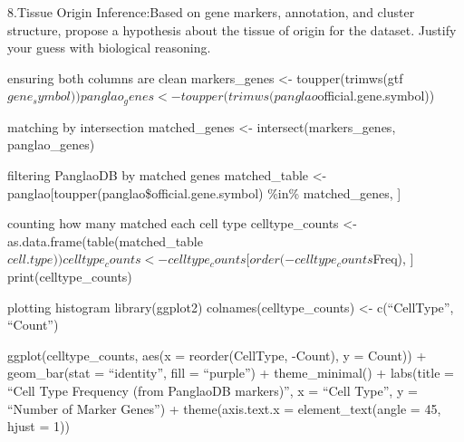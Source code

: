 \documentclass[
  ignorenonframetext,
]{beamer}
\begin{document}
\begin{frame}{8.Tissue Origin Inference:Based on gene markers,
annotation, and cluster structure, propose a hypothesis about the tissue
of origin for the dataset. Justify your guess with biological
reasoning.}
\label{tissue-origin-inferencebased-on-gene-markers-annotation-and-cluster-structure-propose-a-hypothesis-about-the-tissue-of-origin-for-the-dataset.-justify-your-guess-with-biological-reasoning.}
\begin{block}{ensuring both columns are clean}
\label{ensuring-both-columns-are-clean}
markers\_genes \textless- toupper(trimws(gtf\(gene_symbol))
panglao_genes <- toupper(trimws(panglao\)official.gene.symbol))
\end{block}

\begin{block}{matching by intersection}
\label{matching-by-intersection}
matched\_genes \textless- intersect(markers\_genes, panglao\_genes)
\end{block}

\begin{block}{filtering PanglaoDB by matched genes}
\label{filtering-panglaodb-by-matched-genes}
matched\_table \textless-
panglao{[}toupper(panglao\$official.gene.symbol) \%in\% matched\_genes,
{]}
\end{block}

\begin{block}{counting how many matched each cell type}
\label{counting-how-many-matched-each-cell-type}
celltype\_counts \textless-
as.data.frame(table(matched\_table\(cell.type))
celltype_counts <- celltype_counts[order(-celltype_counts\)Freq), {]}
print(celltype\_counts)
\end{block}

\begin{block}{plotting histogram}
\label{plotting-histogram}
library(ggplot2) colnames(celltype\_counts) \textless- c(``CellType'',
``Count'')

ggplot(celltype\_counts, aes(x = reorder(CellType, -Count), y = Count))
+ geom\_bar(stat = ``identity'', fill = ``purple'') + theme\_minimal() +
labs(title = ``Cell Type Frequency (from PanglaoDB markers)'', x =
``Cell Type'', y = ``Number of Marker Genes'') + theme(axis.text.x =
element\_text(angle = 45, hjust = 1))


\end{block}
\end{frame}
\end{document}
